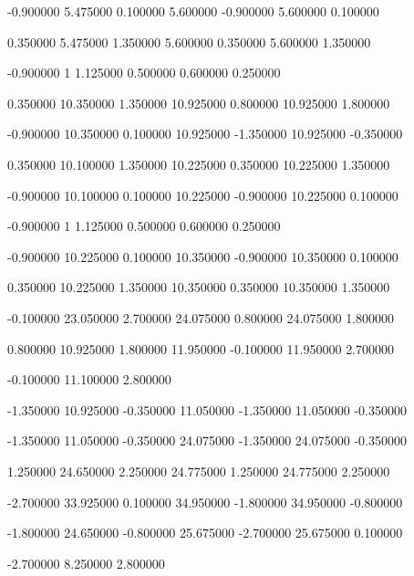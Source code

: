  {-0.900000} {5.475000} {0.100000} {5.600000} {-0.900000} {5.600000} {0.100000}

 {0.350000} {5.475000} {1.350000} {5.600000} {0.350000} {5.600000} {1.350000}

 {-0.900000} {1} {1.125000} {0.500000} {0.600000} {0.250000}

 {0.350000} {10.350000} {1.350000} {10.925000} {0.800000} {10.925000} {1.800000}

 {-0.900000} {10.350000} {0.100000} {10.925000} {-1.350000} {10.925000} {-0.350000}

 {0.350000} {10.100000} {1.350000} {10.225000} {0.350000} {10.225000} {1.350000}

 {-0.900000} {10.100000} {0.100000} {10.225000} {-0.900000} {10.225000} {0.100000}

 {-0.900000} {1} {1.125000} {0.500000} {0.600000} {0.250000}

 {-0.900000} {10.225000} {0.100000} {10.350000} {-0.900000} {10.350000} {0.100000}

 {0.350000} {10.225000} {1.350000} {10.350000} {0.350000} {10.350000} {1.350000}

 {-0.100000} {23.050000} {2.700000} {24.075000} {0.800000} {24.075000} {1.800000}

 {0.800000} {10.925000} {1.800000} {11.950000} {-0.100000} {11.950000} {2.700000}

 {-0.100000} {11.100000} {2.800000}

 {-1.350000} {10.925000} {-0.350000} {11.050000} {-1.350000} {11.050000} {-0.350000}

 {-1.350000} {11.050000} {-0.350000} {24.075000} {-1.350000} {24.075000} {-0.350000}

 {1.250000} {24.650000} {2.250000} {24.775000} {1.250000} {24.775000} {2.250000}

 {-2.700000} {33.925000} {0.100000} {34.950000} {-1.800000} {34.950000} {-0.800000}

 {-1.800000} {24.650000} {-0.800000} {25.675000} {-2.700000} {25.675000} {0.100000}

 {-2.700000} {8.250000} {2.800000}


